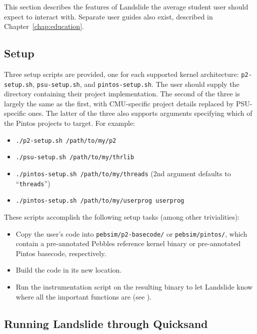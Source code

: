 This section describes the features of Landslide the average student user should expect to interact with.
Separate user guides also exist, described in Chapter~\ref{chap:education}.


\subsection{Setup}
\label{sec:landslide-setup}

Three setup scripts are provided, one for each supported kernel architecture: {\tt p2-setup.sh}, {\tt psu-setup.sh}, and {\tt pintos-setup.sh}.
The user should supply the directory containing their project implementation.
The second of the three is largely the same as the first, with CMU-specific project details replaced by PSU-specific ones.
The latter of the three also supports arguments specifying which of the Pintos projects to target.
For example:
\begin{itemize}
	\item {\tt ./p2-setup.sh /path/to/my/p2}
	\item {\tt ./psu-setup.sh /path/to/my/thrlib}
	\item {\tt ./pintos-setup.sh /path/to/my/threads} (2nd argument defaults to ``{\tt threads}'')
	\item {\tt ./pintos-setup.sh /path/to/my/userprog userprog}
\end{itemize}

These scripts accomplish the following setup tasks (among other trivialities):
\begin{itemize}
	\item Copy the user's code into {\tt pebsim/p2-basecode/} or {\tt pebsim/pintos/},
		which contain a pre-annotated Pebbles reference kernel binary or pre-annotated Pintos basecode, respectively.
	\item Build the code in its new location.
	\item Run the instrumentation script on the resulting binary to let Landslide know where all the important functions are
		(see \sect{\ref{sec:landslide-glue}}).
\end{itemize}


\subsection{Running Landslide through Quicksand}
\label{sec:landslide-quicksand-options}


